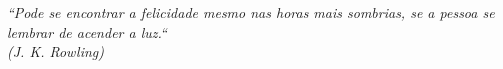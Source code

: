 \begin{epigrafe}
    \vspace*{\fill}
	\begin{flushright}
		\textit{``Pode se encontrar a felicidade mesmo nas horas mais sombrias, se a pessoa se lembrar de acender a luz.``\\
		(J. K. Rowling)}
	\end{flushright}
\end{epigrafe}
